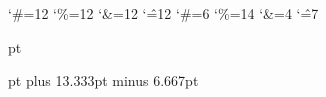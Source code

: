 

\catcode`\#=12 \catcode`\%=12 \catcode`\&=12 \catcode`\^=12
\catcode`\#=6 \catcode`\%=14 \catcode`\&=4 \catcode`\^=7
%

\XrefSideAlignfalse
\ColNotesfalse
\XrefTopfillfalse


\def\FootNoteRuleLeftIndent{\hskip 0.00 mm}
\def\FootNoteRuleRightIndent{\hss}
\def\FootNoteRuleThickness{0.5 pt}
\def\FootNoteRuleWidth{1.00}
\def\BelowFootNoteRuleSpace{2.0 pt}
 pt

\def\StudyNoteRuleLeftIndent{\hskip 0.00 mm}
\def\StudyNoteRuleRightIndent{\hss}
\def\StudyNoteRuleThickness{0.5 pt}
\def\StudyNoteRuleWidth{1.00}
\def\BelowStudyNoteRuleSpace{2.0 pt}
 pt
\InterNoteSpace=3.5pt
\NoteGutterRulefalse
\JoinGutterRulefalse
\internoteskip=11.667pt plus 13.333pt minus 6.667pt


\def\HeaderPosition{0.835}
\def\FooterPosition{0.308}
\def\RangeSeparator{\kern.1em\char"2013\kern.1em} %
\def\ChapterVerseSeparator{\kern.02em:\kern.02em} %

\def\RHevenleft{\rangeref}
\def\RHevencenter{\pagenumber}
\def\RHevenright{\empty}

